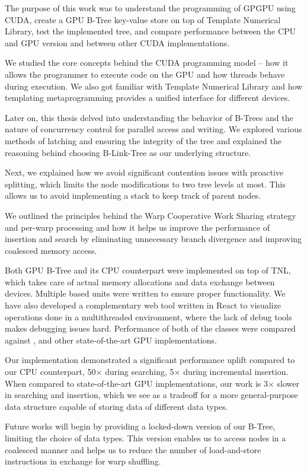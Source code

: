 The purpose of this work was to understand the programming of GPGPU using CUDA, create a GPU B-Tree key-value store on top of Template Numerical Library, test the implemented tree, and compare performance between the CPU and GPU version and between other CUDA implementations.

We studied the core concepts behind the CUDA programming model -- how it allows the programmer to execute code on the GPU and how threads behave during execution. We also got familiar with Template Numerical Library and how templating metaprogramming provides a unified interface for different devices.

Later on, this thesis delved into understanding the behavior of B-Trees and the nature of concurrency control for parallel access and writing. We explored various methods of latching and ensuring the integrity of the tree and explained the reasoning behind choosing B-Link-Tree as our underlying structure.

Next, we explained how we avoid significant contention issues with proactive splitting, which limits the node modifications to two tree levels at most. This allows us to avoid implementing a stack to keep track of parent nodes.

We outlined the principles behind the Warp Cooperative Work Sharing strategy and per-warp processing and how it helps us improve the performance of insertion and search by eliminating unnecessary branch divergence and improving coalesced memory access.

Both GPU B-Tree and its CPU counterpart were implemented on top of TNL, which takes care of actual memory allocations and data exchange between devices. Multiple  based units were written to ensure proper functionality. We have also developed a complementary web tool written in React to visualize operations done in a multithreaded environment, where the lack of debug tools makes debugging issues hard. Performance of both of the classes were compared against ,  and other state-of-the-art GPU implementations.

Our implementation demonstrated a significant performance uplift compared to our CPU counterpart, 50$\times$ during searching, 5$\times$ during incremental insertion. When compared to state-of-the-art GPU implementations, our work is 3$\times$ slower in searching and insertion, which we see as a tradeoff for a more general-purpose data structure capable of storing data of different data types.

Future works will begin by providing a locked-down version of our B-Tree, limiting the choice of data types. This version enables us to access nodes in a coalesced manner and helps us to reduce the number of load-and-store instructions in exchange for warp shuffling.